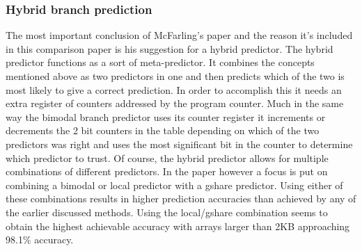 \subsubsection{Hybrid branch prediction}
The most important conclusion of McFarling's paper and the reason it's included in this comparison paper is his suggestion for a hybrid predictor.
The hybrid predictor functions as a sort of meta-predictor.
It combines the concepts mentioned above as two predictors in one and then predicts which of the two is most likely to give a correct prediction.
In order to accomplish this it needs an extra register of counters addressed by the program counter.
Much in the same way the bimodal branch predictor uses its counter register it increments or decrements the 2 bit counters in the table depending on which of the two predictors was right and uses the most significant bit in the counter to determine which predictor to trust.
Of course, the hybrid predictor allows for multiple combinations of different predictors.
In the paper however a focus is put on combining a bimodal or local predictor with a gshare predictor.
Using either of these combinations results in higher prediction accuracies than achieved by any of the earlier discussed methods.
Using the local/gshare combination seems to obtain the highest achievable accuracy with arrays larger than 2KB approaching 98.1\% accuracy.